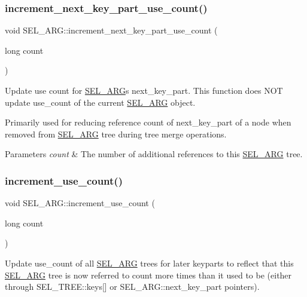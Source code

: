 \subsubsection{\texorpdfstring{increment\+\_\+next\+\_\+key\+\_\+part\+\_\+use\+\_\+count()}{increment\_next\_key\_part\_use\_count()}}
{\footnotesize\ttfamily void S\+E\+L\+\_\+\+A\+R\+G\+::increment\+\_\+next\+\_\+key\+\_\+part\+\_\+use\+\_\+count (\begin{DoxyParamCaption}\item[{long}]{count }\end{DoxyParamCaption})\hspace{0.3cm}{\ttfamily [inline]}}

Update use count for \mbox{\hyperlink{classSEL__ARG}{S\+E\+L\+\_\+\+A\+RG}}\textquotesingle{}s next\+\_\+key\+\_\+part. This function does N\+OT update use\+\_\+count of the current \mbox{\hyperlink{classSEL__ARG}{S\+E\+L\+\_\+\+A\+RG}} object.

Primarily used for reducing reference count of next\+\_\+key\+\_\+part of a node when removed from \mbox{\hyperlink{classSEL__ARG}{S\+E\+L\+\_\+\+A\+RG}} tree during tree merge operations.


\begin{DoxyParams}{Parameters}
{\em count} & The number of additional references to this \mbox{\hyperlink{classSEL__ARG}{S\+E\+L\+\_\+\+A\+RG}} tree. \\
\hline
\end{DoxyParams}
\mbox{\label{classSEL__ARG_a35b87fe0aad5b3832782d51cf9e6d79a}} 
\subsubsection{\texorpdfstring{increment\+\_\+use\+\_\+count()}{increment\_use\_count()}}
{\footnotesize\ttfamily void S\+E\+L\+\_\+\+A\+R\+G\+::increment\+\_\+use\+\_\+count (\begin{DoxyParamCaption}\item[{long}]{count }\end{DoxyParamCaption})\hspace{0.3cm}{\ttfamily [inline]}}

Update use\+\_\+count of all \mbox{\hyperlink{classSEL__ARG}{S\+E\+L\+\_\+\+A\+RG}} trees for later keyparts to reflect that this \mbox{\hyperlink{classSEL__ARG}{S\+E\+L\+\_\+\+A\+RG}} tree is now referred to \textquotesingle{}count\textquotesingle{} more times than it used to be (either through S\+E\+L\+\_\+\+T\+R\+E\+E\+::keys\mbox{[}\mbox{]} or S\+E\+L\+\_\+\+A\+R\+G\+::next\+\_\+key\+\_\+part pointers).

